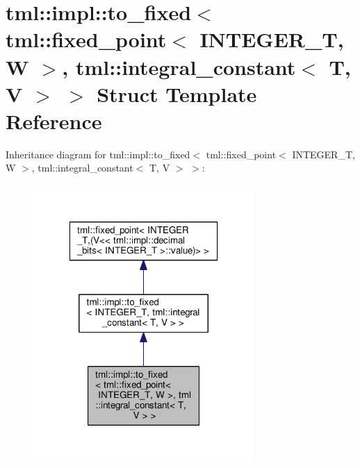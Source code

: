 \hypertarget{structtml_1_1impl_1_1to__fixed_3_01tml_1_1fixed__point_3_01_i_n_t_e_g_e_r___t_00_01_w_01_4_00_01deb96096e589fdbd4311b9f70f1039f8}{\section{tml\+:\+:impl\+:\+:to\+\_\+fixed$<$ tml\+:\+:fixed\+\_\+point$<$ I\+N\+T\+E\+G\+E\+R\+\_\+\+T, W $>$, tml\+:\+:integral\+\_\+constant$<$ T, V $>$ $>$ Struct Template Reference}
\label{structtml_1_1impl_1_1to__fixed_3_01tml_1_1fixed__point_3_01_i_n_t_e_g_e_r___t_00_01_w_01_4_00_01deb96096e589fdbd4311b9f70f1039f8}
}


Inheritance diagram for tml\+:\+:impl\+:\+:to\+\_\+fixed$<$ tml\+:\+:fixed\+\_\+point$<$ I\+N\+T\+E\+G\+E\+R\+\_\+\+T, W $>$, tml\+:\+:integral\+\_\+constant$<$ T, V $>$ $>$\+:
\nopagebreak
\begin{figure}[H]
\begin{center}
\leavevmode
\includegraphics[width=238pt]{structtml_1_1impl_1_1to__fixed_3_01tml_1_1fixed__point_3_01_i_n_t_e_g_e_r___t_00_01_w_01_4_00_01174654936548d397380c2b324d34d2e9}
\end{center}
\end{figure}


